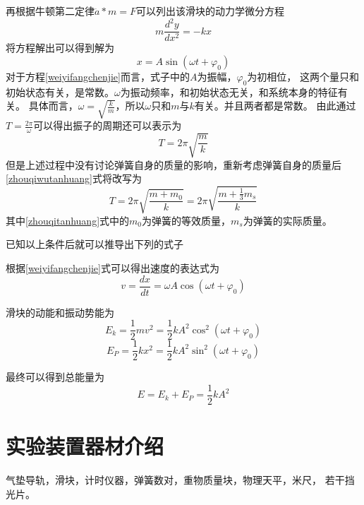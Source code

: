 \documentclass{ctexart}
\begin{document}
再根据牛顿第二定律$\ddot{a}*m=F$可以列出该滑块的动力学微分方程
\begin{equation}\label{niuerweifengfangchen}
  m\frac{d^2 y}{d x^2}=-kx 
\end{equation}
将方程解出可以得到解为
\begin{equation}\label{weiyifangchenjie}
  x=A\sin \left( \omega t+ {\varphi}_{0} \right)
\end{equation}
对于方程\ref{weiyifangchenjie}而言，式子中的$A$为振幅，${\varphi}_{0}$为初相位，
这两个量只和初始状态有关，是常数。$\omega$为振动频率，和初始状态无关，和系统本身的特征有关。
具体而言，$\omega = \sqrt{\frac{k}{m}} $，所以$\omega$只和$m$与$k$有关。并且两者都是常数。
由此通过$T=\frac{2\pi}{\omega}$可以得出振子的周期还可以表示为
\begin{equation}\label{zhouqiwutanhuang}
  T=2\pi \sqrt{\frac{m}{k}}
\end{equation}
但是上述过程中没有讨论弹簧自身的质量的影响，重新考虑弹簧自身的质量后\ref{zhouqiwutanhuang}式将改写为
\begin{equation}\label{zhouqitanhuang}
  T=2\pi \sqrt{\frac{m+m_{0}}{k}}=2\pi \sqrt{\frac{m+\frac{1}{3}m_{s}}{k}}
\end{equation}
其中\ref{zhouqitanhuang}式中的$m_{0}$为弹簧的等效质量，$m_{s}$为弹簧的实际质量。

已知以上条件后就可以推导出下列的式子

根据\ref{weiyifangchenjie}式可以得出速度的表达式为
\begin{equation}
  v=\frac{dx}{dt} =\omega A \cos \left( \omega t + {\varphi}_{0} \right)
\end{equation}

滑块的动能和振动势能为
\begin{equation}
  E_{k}=\frac{1}{2} mv^{2}=\frac{1}{2}kA^{2} {\cos}^{2}\left( \omega t + {\varphi}_{0} \right)
\end{equation}
\begin{equation}
  E_{P}=\frac{1}{2}kx^{2}=\frac{1}{2}kA^{2} {\sin}^{2} \left( \omega t + {\varphi}_{0} \right)
\end{equation}

最终可以得到总能量为
\begin{equation}
  E=E_{k}+E_{P}=\frac{1}{2}kA^{2}
\end{equation}

\section{实验装置器材介绍}
气垫导轨，滑块，计时仪器，弹簧数对，重物质量块，物理天平，米尺，
若干挡光片。
\end{document}
